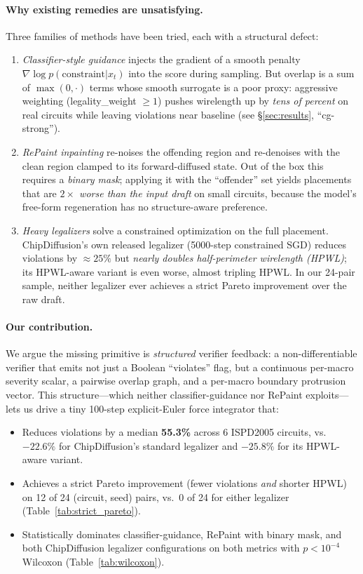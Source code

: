 \documentclass{article}
\begin{document}
\paragraph{Why existing remedies are unsatisfying.}  Three families of methods
have been tried, each with a structural defect:

\begin{enumerate}
\item \emph{Classifier-style guidance} \cite{classifier-guidance,
constraint-guidance} injects the gradient of a smooth
penalty $\nabla \log p(\mathrm{constraint}|x_t)$ into the score during sampling.
But overlap is a sum of $\max(0, \cdot)$ terms whose smooth surrogate is a poor
proxy: aggressive weighting (legality\_weight $\geq 1$) pushes wirelength up by
\emph{tens of percent} on real circuits while leaving violations near baseline
(see \S\ref{sec:results}, ``cg-strong'').
\item \emph{RePaint inpainting} \cite{repaint} re-noises the offending region
and re-denoises with the clean region clamped to its forward-diffused state.
Out of the box this requires a \emph{binary mask}; applying it with the
``offender'' set yields placements that are \emph{$2\times$ worse than the
input draft} on small circuits, because the model's free-form regeneration
has no structure-aware preference.
\item \emph{Heavy legalizers} \cite{ntuplace, dreamplace, chipdiffusion}
solve a constrained optimization on the full placement.  ChipDiffusion's own
released legalizer (5000-step constrained SGD) reduces violations by
$\approx 25\%$ but \emph{nearly doubles half-perimeter wirelength (HPWL)}; its
HPWL-aware variant is even worse, almost tripling HPWL.  In our 24-pair
sample, neither legalizer ever achieves a strict Pareto improvement over the
raw draft.
\end{enumerate}

\paragraph{Our contribution.}  We argue the missing primitive is
\emph{structured} verifier feedback: a non-differentiable verifier that emits
not just a Boolean ``violates'' flag, but a continuous per-macro severity
scalar, a pairwise overlap graph, and a per-macro boundary protrusion vector.
This structure---which neither classifier-guidance nor RePaint exploits---lets
us drive a tiny 100-step explicit-Euler force integrator that:
\begin{itemize}
\item Reduces violations by a median \textbf{55.3\%} across 6 ISPD2005
circuits, vs.\ $-22.6\%$ for ChipDiffusion's standard legalizer and
$-25.8\%$ for its HPWL-aware variant.
\item Achieves a strict Pareto improvement (fewer violations \emph{and}
shorter HPWL) on 12 of 24 (circuit, seed) pairs, vs.\ 0 of 24 for either
legalizer (Table~\ref{tab:strict_pareto}).
\item Statistically dominates classifier-guidance, RePaint with
binary mask, and both ChipDiffusion legalizer configurations on both
metrics with $p<10^{-4}$ Wilcoxon (Table~\ref{tab:wilcoxon}).
\end{itemize}
\end{document}
